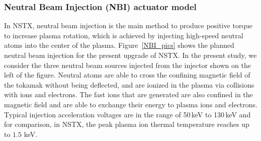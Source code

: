 \documentclass[12pt]{iopart}
\begin{document}
\subsubsection{Neutral Beam Injection (NBI) actuator model}
 \label{NBIAM}

In NSTX, neutral beam injection is the main method to produce positive torque to increase plasma rotation, which is achieved  by injecting high-speed neutral atoms into the center of the plasma. Figure~{\ref{NBI_pics}} shows the planned neutral beam injection for the present upgrade of NSTX. In the present study, we consider the three neutral beam sources injected from the injector shown on the left of the figure.
 Neutral atoms are able to cross the confining magnetic field of the tokamak without being deflected, and are ionized in the plasma via collisions with ions and electrons. The fast ions that are generated are also confined in the magnetic field and are able to exchange their energy to plasma ions and electrons. Typical injection acceleration voltages are in the range of 50\,keV to 130\,keV and for comparison, in NSTX, the peak plasma ion thermal temperature reaches up to $1.5$ keV.
\end{document}
